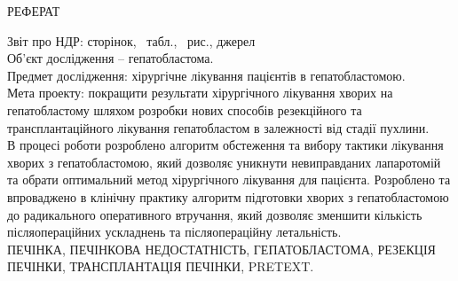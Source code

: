 \thispagestyle{empty}
\begin{center}
    \MakeUppercase{РЕФЕРАТ}
\end{center}



\noindent Звіт про НДР: \pageref{LastPage} сторінок, \tottab\ табл.,  \totfig\ рис.,  джерел \\

\noindent Об'єкт дослідження – гепатобластома.\\

\noindent Предмет дослідження:  хірургічне лікування пацієнтів в гепатобластомою.\\

\noindent Мета проекту:  покращити результати хірургічного лікування хворих на гепатобластому шляхом розробки нових способів резекційного та трансплантаційного лікування гепатобластом в залежності від стадії пухлини. \\

В процесі роботи розроблено алгоритм обстеження та вибору тактики лікування хворих з гепатобластомою, який дозволяє уникнути невиправданих лапаротомій та обрати оптимальний метод хірургічного лікування для пацієнта. Розроблено та впроваджено в клінічну практику алгоритм підготовки хворих з гепатобластомою до радикального оперативного втручання, який дозволяє зменшити кількість післяопераційних ускладнень та післяопераційну летальність. \\

\noindent ПЕЧІНКА, ПЕЧІНКОВА НЕДОСТАТНІСТЬ, ГЕПАТОБЛАСТОМА, РЕЗЕКЦІЯ ПЕЧІНКИ, ТРАНСПЛАНТАЦІЯ ПЕЧІНКИ, PRETEXT.
